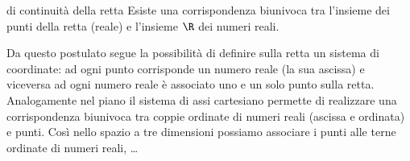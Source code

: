 \begin{postulato}{di continuità della retta}{}
Esiste una corrispondenza biunivoca tra l'insieme dei punti della retta 
(reale) e l'insieme \(\R\) dei numeri reali.
\end{postulato}

Da questo postulato segue la possibilità di definire sulla retta un sistema 
di coordinate: ad ogni punto corrisponde un numero reale (la sua ascissa) e 
viceversa ad ogni numero reale è associato uno e un solo punto sulla retta. 
Analogamente nel piano il sistema di assi cartesiano permette di 
realizzare una corrispondenza biunivoca tra coppie ordinate di numeri reali 
(ascissa e ordinata) e punti. 
Così nello spazio a tre dimensioni possiamo associare i punti alle terne 
ordinate di numeri reali, \dots

%
% 
% 

